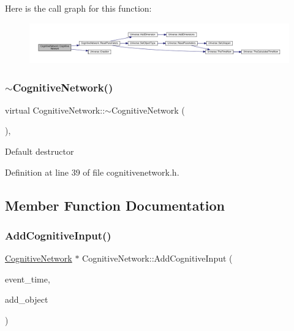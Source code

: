 Here is the call graph for this function\+:
\nopagebreak
\begin{figure}[H]
\begin{center}
\leavevmode
\includegraphics[width=350pt]{class_cognitive_network_a6ec49dcc8cc58cded71983291629179c_cgraph}
\end{center}
\end{figure}
\mbox{\label{class_cognitive_network_a17142cc6f0bb3894e63f6c66fa401778}} 
\subsubsection{\texorpdfstring{$\sim$\+Cognitive\+Network()}{~CognitiveNetwork()}}
{\footnotesize\ttfamily virtual Cognitive\+Network\+::$\sim$\+Cognitive\+Network (\begin{DoxyParamCaption}{ }\end{DoxyParamCaption})\hspace{0.3cm}{\ttfamily [inline]}, {\ttfamily [virtual]}}

Default destructor 

Definition at line 39 of file cognitivenetwork.\+h.



\subsection{Member Function Documentation}
\mbox{\label{class_cognitive_network_a6af57693982286ac6a6831ca3010b760}} 
\subsubsection{\texorpdfstring{Add\+Cognitive\+Input()}{AddCognitiveInput()}}
{\footnotesize\ttfamily \hyperlink{class_cognitive_network}{Cognitive\+Network} $\ast$ Cognitive\+Network\+::\+Add\+Cognitive\+Input (\begin{DoxyParamCaption}\item[{std\+::chrono\+::time\+\_\+point$<$ \hyperlink{universe_8h_a0ef8d951d1ca5ab3cfaf7ab4c7a6fd80}{Clock} $>$}]{event\+\_\+time,  }\item[{\hyperlink{class_cognitive_network}{Cognitive\+Network} $\ast$}]{add\+\_\+object }\end{DoxyParamCaption})}



